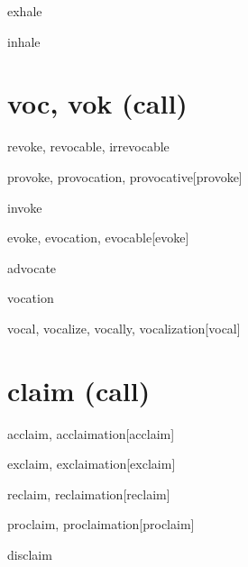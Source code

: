 \begin{RefWord}{exhale}
\end{RefWord}

\begin{RefWord}{inhale}
\end{RefWord}




\section{voc, vok (call)}

\begin{RefWord}{revoke, revocable, irrevocable}
\end{RefWord}

\begin{RefWord}{provoke, provocation, provocative}[provoke]
\end{RefWord}

\begin{RefWord}{invoke}
\end{RefWord}


\begin{RefWord}{evoke, evocation, evocable}[evoke]
\end{RefWord}

\begin{RefWord}{advocate}
\end{RefWord}

\begin{RefWord}{vocation}
\end{RefWord}

\begin{RefWord}{vocal, vocalize, vocally, vocalization}[vocal]
\end{RefWord}










\section{claim (call)}

\begin{RefWord}{acclaim, acclaimation}[acclaim]
\end{RefWord}

\begin{RefWord}{exclaim, exclaimation}[exclaim]
\end{RefWord}

\begin{RefWord}{reclaim, reclaimation}[reclaim]
\end{RefWord}

\begin{RefWord}{proclaim, proclaimation}[proclaim]
\end{RefWord}

\begin{RefWord}{disclaim}
\end{RefWord}